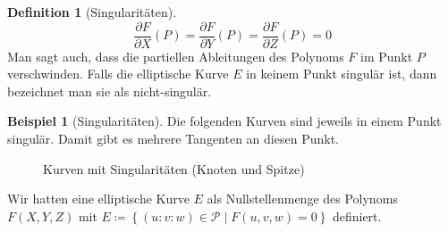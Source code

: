 \documentclass[hidelinks]{article}
\theoremstyle{plain}
\theoremstyle{definition}
\newtheorem{defn}[thm]{Definition}
\newtheorem{bsp}[thm]{Beispiel}
\theoremstyle{rem}
\begin{document}
\begin{sloppypar}
\begin{defn}[Singularitäten]
\begin{equation*}
        \frac{\partial F}{\partial X}(P) = \frac{\partial F}{\partial Y}(P) =  \frac{\partial F}{\partial Z}(P) = 0
    \end{equation*}
    Man sagt auch, dass die partiellen Ableitungen des Polynoms $F$ im Punkt $P$ verschwinden. Falls die elliptische Kurve $E$ in keinem Punkt singulär ist, dann bezeichnet man sie als nicht-singulär.\cite[Seite~227]{karpfinger-kiechle}
\end{defn}
\begin{bsp}[Singularitäten]
    Die folgenden Kurven sind jeweils in einem Punkt singulär. Damit gibt es mehrere Tangenten an diesen Punkt.
    \begin{figure}[H]
        \centering
        \qquad
        \caption{Kurven mit Singularitäten (Knoten und Spitze)}
    \end{figure}
\end{bsp}
Wir hatten eine elliptische Kurve $E$ als Nullstellenmenge des Polynoms $F(X,Y,Z)$ mit \mbox{$E \coloneqq \left\{(u:v:w) \in \mathcal{P} \mid F(u,v,w) = 0 \right\}$} definiert.

\end{sloppypar}
\end{document}
